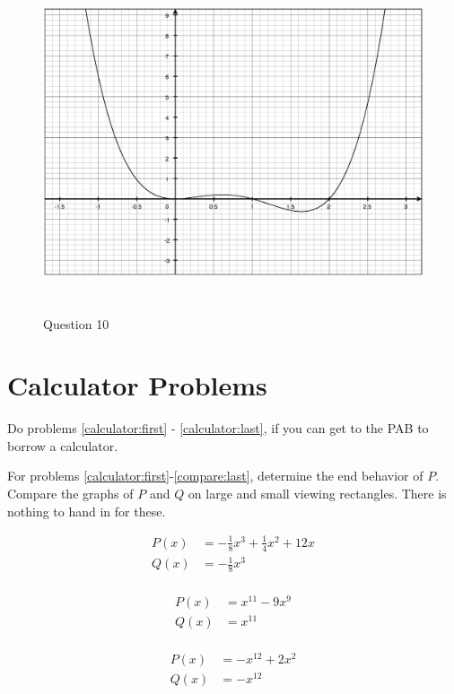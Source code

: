\documentclass[fleqn,addpoints]{exam}
\begin{document}
\begin{questions}
\begin{solution}
\begin{figure}[H]
  \centering
  \includegraphics[width=14cm,height=10cm]{question_10.eps}
  \caption*{Question 10}
\end{figure}

\end{solution}

\section{Calculator Problems}

Do problems \ref{calculator:first} - \ref{calculator:last}, if you can get to the PAB to borrow a calculator.  

For problems \ref{calculator:first}-\ref{compare:last}, determine the end behavior of $P$.  Compare the graphs of $P$ and
$Q$ on large and small viewing rectangles.  There is nothing to hand in for these.

\question
\label{calculator:first}
\begin{align*}  
  P(x) &= -\frac{1}{8}x^3 + \frac{1}{4}x^2 + 12x \\
  Q(x) &= -\frac{1}{8}x^3 \\
\end{align*}

\question
\begin{align*}
  P(x) &= x^{11} - 9x^9\\
  Q(x) &= x^{11} \\
\end{align*}

\question
\label{compare:last}
\begin{align*}
  P(x) &= -x^{12} + 2x^2\\
  Q(x) &= -x^{12} \\
\end{align*}


\end{questions}
\end{document}
